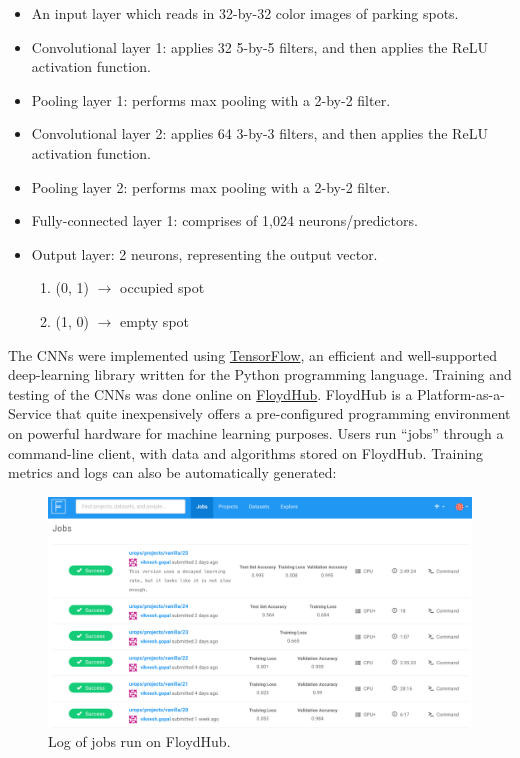 \documentclass[a4paper, 11pt]{article} %
\begin{document}
	\begin{itemize}
		\item[] An input layer which reads in 32-by-32 color images of parking spots.
		\item[] Convolutional layer 1: applies 32 5-by-5 filters, and then applies the ReLU activation 
		function.
		\item[] Pooling layer 1: performs max pooling with a 2-by-2 filter.
		\item[] Convolutional layer 2: applies 64 3-by-3 filters, and then applies the ReLU activation 
		function.
		\item[] Pooling layer 2: performs max pooling with a 2-by-2 filter.
		\item[] Fully-connected layer 1: comprises of 1,024 neurons/predictors.
		\item[] Output layer: 2 neurons, representing the output vector.
		\vspace*{-4mm}
		\begin{enumerate}
			\setlength\itemsep{-3mm}
			\item[] (0, 1) $\rightarrow$ occupied spot
			\item[] (1, 0) $\rightarrow$ empty spot
		\end{enumerate}
	\end{itemize}
   	The CNNs were implemented using \href{https://www.tensorflow.org}{TensorFlow}, an efficient and 
   	well-supported deep-learning library written for the Python programming language. Training and 
   	testing of the CNNs was done online on \href{https://www.floydhub.com}{FloydHub}. FloydHub is a 
   	Platform-as-a-Service that quite inexpensively offers a pre-configured programming environment on 
   	powerful hardware for machine learning purposes. Users run ``jobs'' through a command-line client, 
   	with data and algorithms stored on FloydHub. Training metrics and logs can also be automatically 
    generated:
    \vskip 5mm
    \begin{figure}[H]
    	\centering
    	\includegraphics[width=14cm]{figures/floydhub.png}
    	\caption{Log of jobs run on FloydHub.}
    \end{figure}
\end{document}
